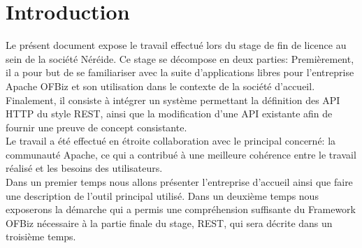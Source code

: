 \chapter{Introduction}

Le présent document expose le travail effectué lors du stage de fin de licence au sein de la société Néréide.
Ce stage se décompose en deux parties: 
Premièrement, il a pour but de se familiariser avec la suite d'applications libres
pour l'entreprise
Apache OFBiz et son utilisation dans le contexte de la société d'accueil. 
Finalement, il consiste à intégrer un système permettant la définition des API HTTP
du style REST,
 ainsi que la modification d'une API existante afin de fournir une preuve de concept consistante. \\
Le travail a été effectué en étroite collaboration avec le principal concerné: la communauté Apache,
ce qui a contribué à une meilleure cohérence entre le travail réalisé et les besoins des utilisateurs.\\
Dans un premier temps nous allons présenter l'entreprise d'accueil ainsi que faire une description de
l'outil principal utilisé.
Dans un deuxième temps nous exposerons la démarche qui a permis une compréhension suffisante du Framework OFBiz
 nécessaire à la partie finale du stage, REST, qui sera décrite dans un troisième temps. 

